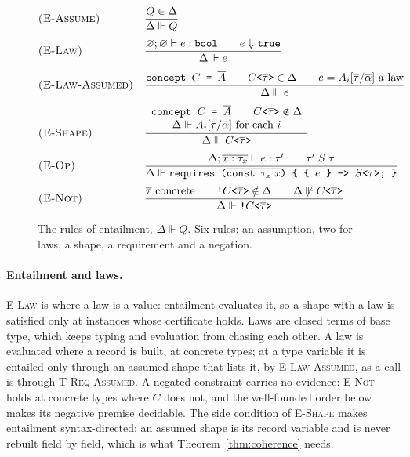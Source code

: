 \begin{figure}[htbp]
\[
\begin{array}{@{}l@{\quad}l@{}}
\textsc{(E-Assume)} & \dfrac{Q \in \Delta}{\Delta \Vdash Q}
\\[12pt]
\textsc{(E-Law)} & \dfrac{\varnothing; \varnothing \vdash e : \texttt{bool} \qquad e \Downarrow \texttt{true}}{\Delta \Vdash e}
\\[12pt]
\textsc{(E-Law-Assumed)} & \dfrac{\texttt{concept } C \texttt{ = } \overline{A} \qquad C\texttt{<}\overline{\tau}\texttt{>} \in \Delta \qquad e = A_i[\overline{\tau}/\overline{\alpha}] \text{ a law}}{\Delta \Vdash e}
\\[12pt]
\textsc{(E-Shape)} & \dfrac{\begin{array}{c} \texttt{concept } C \texttt{ = } \overline{A} \qquad C\texttt{<}\overline{\tau}\texttt{>} \notin \Delta \\ \Delta \Vdash A_i[\overline{\tau}/\overline{\alpha}] \text{ for each } i \end{array}}{\Delta \Vdash C\texttt{<}\overline{\tau}\texttt{>}}
\\[12pt]
\textsc{(E-Op)} & \dfrac{\Delta; \overline{x : \tau_x} \vdash e : \tau' \qquad \tau' \mathrel{S} \tau}{\Delta \Vdash \texttt{requires (}\overline{\texttt{const }\tau_x\; x}\texttt{) \{ \{ }e\texttt{ \} -> }S\texttt{<}\tau\texttt{>; \}}}
\\[12pt]
\textsc{(E-Not)} & \dfrac{\overline{\tau} \text{ concrete} \qquad \texttt{!}C\texttt{<}\overline{\tau}\texttt{>} \notin \Delta \qquad \Delta \not\Vdash C\texttt{<}\overline{\tau}\texttt{>}}{\Delta \Vdash \texttt{!}C\texttt{<}\overline{\tau}\texttt{>}}
\end{array}
\]
\caption{The rules of entailment, $\Delta \Vdash Q$.
Six rules: an assumption, two for laws, a shape, a requirement and a negation.}
\label{fig:fjlt-entailment}
\end{figure}

\paragraph{Entailment and laws.}
\textsc{E-Law} is where a law is a value: entailment evaluates it, so a shape with a law is satisfied only at instances whose certificate holds.
Laws are closed terms of base type, which keeps typing and evaluation from chasing each other.
A law is evaluated where a record is built, at concrete types; at a type variable it is entailed only through an assumed shape that lists it, by \textsc{E-Law-Assumed}, as a call is through \textsc{T-Req-Assumed}.
A negated constraint  carries no evidence: \textsc{E-Not} holds at concrete types where $C$ does not, and the well-founded order below makes its negative premise decidable.
The side condition of \textsc{E-Shape} makes entailment syntax-directed: an assumed shape is its record variable and is never rebuilt field by field, which is what Theorem~\ref{thm:coherence} needs.

